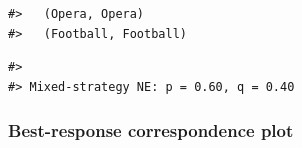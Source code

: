\documentclass[
]{article}
\newenvironment{Shaded}{\begin{snugshade}}{\end{snugshade}}
\newcommand{\FunctionTok}[1]{\textcolor[rgb]{0.13,0.29,0.53}{\textbf{#1}}}
\newcommand{\NormalTok}[1]{#1}
\newcommand{\SpecialCharTok}[1]{\textcolor[rgb]{0.81,0.36,0.00}{\textbf{#1}}}
\newcommand{\StringTok}[1]{\textcolor[rgb]{0.31,0.60,0.02}{#1}}
\begin{document}
\begin{verbatim}
#>   (Opera, Opera)
#>   (Football, Football)
\end{verbatim}

\begin{Shaded}
\end{Shaded}

\begin{verbatim}
#> 
#> Mixed-strategy NE: p = 0.60, q = 0.40
\end{verbatim}

\subsubsection{Best-response correspondence
plot}\label{best-response-correspondence-plot}
\end{document}
